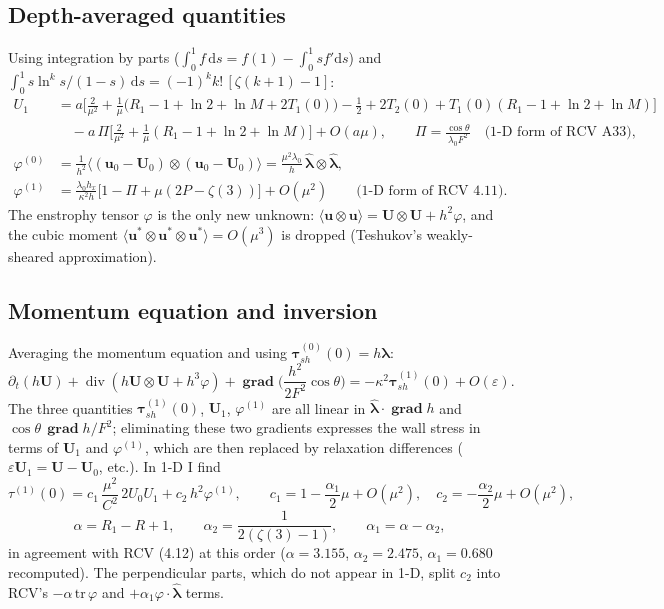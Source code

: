\documentclass[10pt,a4paper]{article}
\newcommand{\bu}{\bm{u}}
\newcommand{\bU}{\bm{U}}
\newcommand{\btau}{\bm{\tau}}
\newcommand{\blam}{\bm{\lambda}}
\newcommand{\hlam}{\hat{\bm{\lambda}}}
\newcommand{\grad}{\operatorname{\mathbf{grad}}}
\newcommand{\dvg}{\operatorname{div}}
\newcommand{\avg}[1]{\langle #1\rangle}
\newcommand{\dd}{\mathrm{d}}
\begin{document}
\subsection{Depth-averaged quantities}
Using integration by parts ($\int_0^1 f\,\dd s=f(1)-\int_0^1 s f'\dd s$) and $\int_0^1 s\ln^ks/(1-s)\,\dd s=(-1)^kk!\,[\zeta(k+1)-1]$:
\begin{align}
U_1&=a\Big[\frac2{\mu^2}+\frac1\mu\big(R_1-1+\ln2+\ln M+2T_1(0)\big)-\frac12+2T_2(0)+T_1(0)(R_1-1+\ln2+\ln M)\Big]\nonumber\\
&\quad-a\,\Pi\Big[\frac2{\mu^2}+\frac1\mu(R_1-1+\ln2+\ln M)\Big]+O(a\mu),\qquad \Pi=\frac{\cos\theta}{\lambda_0F^2}\quad\text{(1-D form of RCV A33)},\\
\varphi^{(0)}&=\frac1{h^2}\avg{(\bu_0-\bU_0)\otimes(\bu_0-\bU_0)}=\frac{\mu^2\lambda_0}{h}\,\hlam\otimes\hlam,\\
\varphi^{(1)}&=\frac{\lambda_0h_x}{\kappa^2h}\big[1-\Pi+\mu(2P-\zeta(3))\big]+O(\mu^2)\qquad\text{(1-D form of RCV 4.11)}.
\end{align}
The enstrophy tensor $\varphi$ is the only new unknown: $\avg{\bu\otimes\bu}=\bU\otimes\bU+h^2\varphi$, and the cubic moment $\avg{\bu^*\otimes\bu^*\otimes\bu^*}=O(\mu^3)$ is dropped (Teshukov's weakly-sheared approximation).

\subsection{Momentum equation and inversion}
Averaging the momentum equation and using $\btau^{(0)}_{sh}(0)=h\blam$:
\begin{equation}
\partial_t(h\bU)+\dvg(h\bU\otimes\bU+h^3\varphi)+\grad\Big(\frac{h^2}{2F^2}\cos\theta\Big)=-\kappa^2\btau^{(1)}_{sh}(0)+O(\varepsilon).
\end{equation}
The three quantities $\btau^{(1)}_{sh}(0)$, $\bU_1$, $\varphi^{(1)}$ are all linear in $\hlam\cdot\grad h$ and $\cos\theta\,\grad h/F^2$; eliminating these two gradients expresses the wall stress in terms of $\bU_1$ and $\varphi^{(1)}$, which are then replaced by relaxation differences ($\varepsilon\bU_1=\bU-\bU_0$, etc.). In 1-D I find
\begin{equation}\label{eq:c1c2}
\tau^{(1)}(0)=c_1\,\frac{\mu^2}{C^2}\,2U_0U_1+c_2\,h^2\varphi^{(1)},\qquad c_1=1-\frac{\alpha_1}{2}\mu+O(\mu^2),\quad c_2=-\frac{\alpha_2}{2}\mu+O(\mu^2),
\end{equation}
\begin{equation}\label{eq:alphas}
\alpha=R_1-R+1,\qquad \alpha_2=\frac{1}{2(\zeta(3)-1)},\qquad \alpha_1=\alpha-\alpha_2 ,
\end{equation}
in agreement with RCV (4.12) at this order ($\alpha=3.155$, $\alpha_2=2.475$, $\alpha_1=0.680$ recomputed). The perpendicular parts, which do not appear in 1-D, split $c_2$ into RCV's $-\alpha\,\mathrm{tr}\,\varphi$ and $+\alpha_1\varphi\cdot\hlam$ terms.
\end{document}
